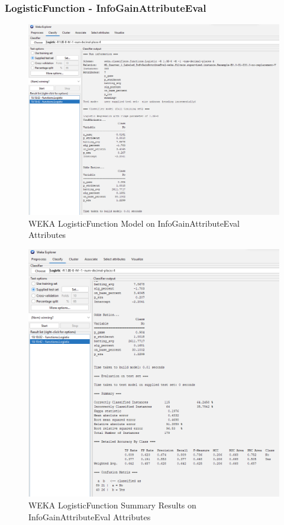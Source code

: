 \documentclass[12pt]{article}
\begin{document}
\subsubsection{LogisticFunction - InfoGainAttributeEval}
\begin{figure}[h!]
    \includegraphics[scale=0.4]{./images/InfoGainAttributeEval/LogisticFunction-Model.png}
\centering
    \caption{WEKA LogisticFunction Model on InfoGainAttributeEval Attributes}
\end{figure}
\newpage
\begin{figure}[h!]
    \includegraphics[scale=0.4]{./images/InfoGainAttributeEval/LogisticFunction-Summary.png}
\centering
    \caption{WEKA LogisticFunction Summary Results on InfoGainAttributeEval Attributes}
\end{figure}
\newpage
\end{document}
